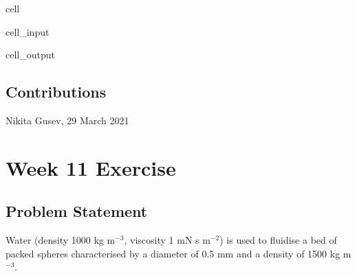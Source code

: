 \documentclass[letterpaper,10pt,english]{jupyterBook}
\begin{document}
\begin{sphinxuseclass}{cell}
\begin{sphinxVerbatimInput}
\begin{sphinxuseclass}{cell_input}
\end{sphinxuseclass}\end{sphinxVerbatimInput}
\begin{sphinxVerbatimOutput}

\begin{sphinxuseclass}{cell_output}
\noindent{}

\end{sphinxuseclass}\end{sphinxVerbatimOutput}

\end{sphinxuseclass}

\subsection{Contributions}
\label{\detokenize{Exercise_W10_2021:contributions}}
\sphinxAtStartPar
Nikita Gusev, 29 March 2021

\sphinxstepscope


\section{Week 11 \sphinxhyphen{} Exercise}
\label{\detokenize{Exercise_W11_2021:week-11-exercise}}\label{\detokenize{Exercise_W11_2021::doc}}

\subsection{Problem Statement}
\label{\detokenize{Exercise_W11_2021:problem-statement}}
\sphinxAtStartPar
Water (density 1000 kg m\(^{-3}\), viscosity 1 mN s m\(^{-2}\)) is used to fluidise a bed of packed spheres characterised by a diameter of 0.5 mm and a density of 1500 kg m\(^{-3}\).
\end{document}
